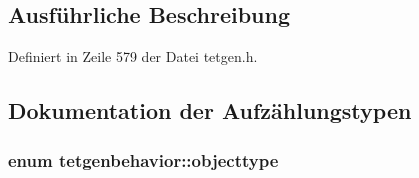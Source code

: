 \subsection{Ausführliche Beschreibung}


Definiert in Zeile 579 der Datei tetgen.\-h.



\subsection{Dokumentation der Aufzählungstypen}
\hypertarget{classtetgenbehavior_aeea08e7334fde4251b74a8247bcc54b8}{
\subsubsection[{objecttype}]{\setlength{\rightskip}{0pt plus 5cm}enum {\bf tetgenbehavior\-::objecttype}}}\label{classtetgenbehavior_aeea08e7334fde4251b74a8247bcc54b8}
